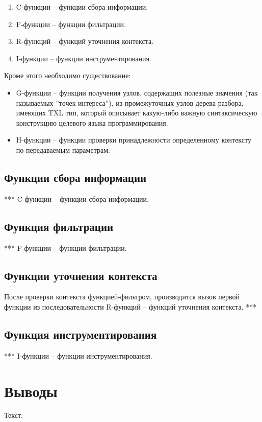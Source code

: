 \begin{enumerate}
  \item C-функции -- функции сбора информации.
  \item F-функции -- функции фильтрации.
  \item R-функций -- функций уточнения контекста.
  \item I-функции -- функции инструментирования.
\end{enumerate}

Кроме этого необходимо существование:
\begin{itemize}
  \item G-функции -- функции получения узлов, содержащих полезные значения (так называемых ''точек интереса''), из промежуточных узлов дерева разбора, имеющих TXL тип, который описывает какую-либо важную синтаксическую конструкцию целевого языка программирования.
  \item H-функции -- функции проверки принадлежности определенному контексту по передаваемым параметрам.
\end{itemize}

\subsection{Функции сбора информации}

***
C-функции -- функции сбора информации.

\subsection{Функция фильтрации}

***
F-функции -- функции фильтрации.

\subsection{Функции уточнения контекста}

После проверки контекста функцией-фильтром, производится вызов первой функции из последовательности R-функций -- функций уточнения контекста.
***

\subsection{Функция инструментирования}

***
I-функции -- функции инструментирования.

\section{Выводы}

Текст.
